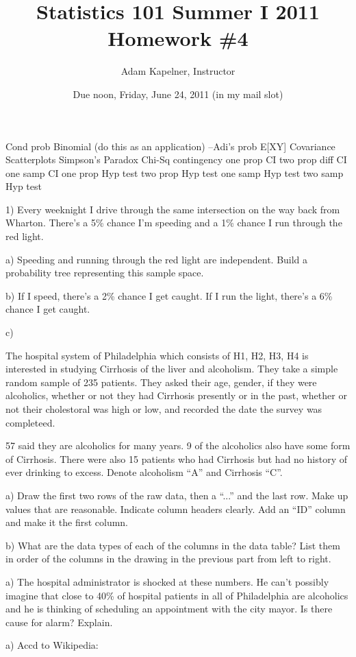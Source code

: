 \documentclass[12pt]{article}
\title{Statistics 101 Summer I 2011 \\ Homework \#4}
\author{Adam Kapelner, Instructor}
\date{Due noon, Friday, June 24, 2011 (in my mail slot)}
\begin{document}
\maketitle

Cond prob
Binomial (do this as an application) --Adi's prob
E[XY] Covariance 
Scatterplots
Simpson's Paradox
Chi-Sq contingency
one prop CI
two prop diff CI
one samp CI
one prop Hyp test
two prop Hyp test
one samp Hyp test
two samp Hyp test


1) Every weeknight I drive through the same intersection on the way back from Wharton. There's a 5\% chance I'm speeding and a 1\% chance I run through the red light.

a) Speeding and running through the red light are independent. Build a probability tree representing this sample space.
 
b) If I speed, there's a 2\% chance I get caught. If I run the light, there's a 6\% chance I get caught.

c) 


The hospital system of Philadelphia which consists of H1, H2, H3, H4 is interested in studying Cirrhosis of the liver and alcoholism. They take a simple random sample of 235 patients. They asked their age, gender, if they were alcoholics, whether or not they had Cirrhosis presently or in the past, whether or not their cholestoral was high or low, and recorded the date the survey was completeed.

57 said they are alcoholics for many years. 9 of the alcoholics also have some form of Cirrhosis. There were also 15 patients who had Cirrhosis but had no history of ever drinking to excess. Denote alcoholism ``A'' and Cirrhosis ``C''. 

a) Draw the first two rows of the raw data, then a ``...'' and the last row. Make up values that are reasonable. Indicate column headers clearly. Add an ``ID'' column and make it the first column.

b) What are the data types of each of the columns in the data table? List them in order of the columns in the drawing in the previous part from left to right.

a) The hospital administrator is shocked at these numbers. He can't possibly imagine that close to 40\% of hospital patients in all of Philadelphia are alcoholics and he is thinking of scheduling an appointment with the city mayor. Is there cause for alarm? Explain.

a) Accd to Wikipedia:
\end{document}

